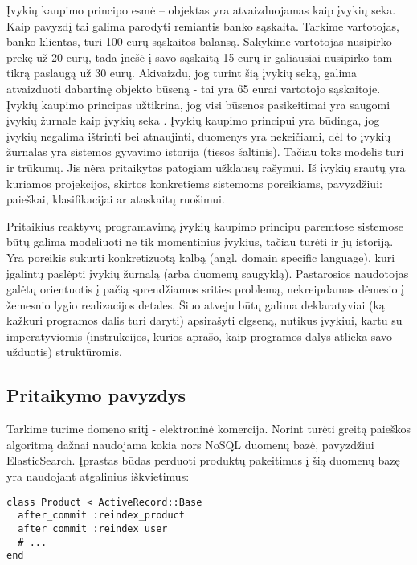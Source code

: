 Įvykių kaupimo principo esmė – objektas yra atvaizduojamas kaip įvykių seka. Kaip pavyzdį tai galima parodyti remiantis banko sąskaita. Tarkime vartotojas, banko klientas, turi 100 eurų sąskaitos balansą. Sakykime vartotojas nusipirko prekę už 20 eurų, tada įnešė į savo sąskaitą 15 eurų ir galiausiai nusipirko tam tikrą paslaugą už 30 eurų. Akivaizdu, jog turint šią įvykių seką, galima atvaizduoti dabartinę objekto būseną - tai yra 65 eurai vartotojo sąskaitoje. Įvykių kaupimo principas užtikrina, jog visi būsenos pasikeitimai yra saugomi įvykių žurnale kaip įvykių seka \cite{vernon2013implementing}. Įvykių kaupimo principui yra būdinga, jog įvykių negalima ištrinti bei atnaujinti, duomenys yra nekeičiami, dėl to įvykių žurnalas yra sistemos gyvavimo istorija (tiesos šaltinis). Tačiau toks modelis turi ir trūkumų. Jis nėra pritaikytas patogiam užklausų rašymui. Iš įvykių srautų yra kuriamos projekcijos, skirtos konkretiems sistemoms poreikiams, pavyzdžiui: paieškai, klasifikacijai ar ataskaitų ruošimui.

Pritaikius reaktyvų programavimą įvykių kaupimo principu paremtose sistemose būtų galima modeliuoti ne tik momentinius įvykius, tačiau turėti ir jų istoriją. Yra poreikis sukurti konkretizuotą kalbą (angl. domain specific language), kuri įgalintų paslėpti įvykių žurnalą (arba duomenų saugyklą). Pastarosios naudotojas galėtų orientuotis į pačią sprendžiamos srities problemą, nekreipdamas dėmesio į žemesnio lygio realizacijos detales. Šiuo atveju būtų galima deklaratyviai (ką kažkuri programos dalis turi daryti) apsirašyti elgseną, nutikus įvykiui, kartu su imperatyviomis (instrukcijos, kurios aprašo, kaip programos dalys atlieka savo užduotis) struktūromis.

\subsection{Pritaikymo pavyzdys}

Tarkime turime domeno sritį - elektroninė komercija. Norint turėti greitą paieškos algoritmą dažnai naudojama kokia nors NoSQL duomenų bazė, pavyzdžiui ElasticSearch. Įprastas būdas perduoti produktų pakeitimus į šią duomenų bazę yra naudojant atgalinius iškvietimus:

\begin{lstlisting}[]
class Product < ActiveRecord::Base
  after_commit :reindex_product
  after_commit :reindex_user
  # ...
end
\end{lstlisting}

